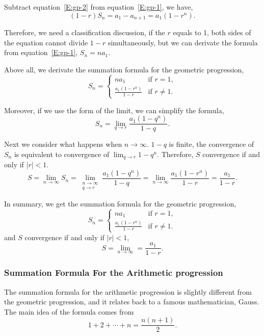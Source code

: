 Subtract equation~\eqref{E:gp-2} from equation~\eqref{E:gp-1}, we have,
\begin{equation}\label{E:gp-3}
    (1-r) S_n = a_1 - a_{n+1} = a_1(1-r^n).
\end{equation}

Therefore, we need a classification discussion, if the $r$ equals to 1, both sides of the equation cannot divide $1-r$ simultaneously, but we can derivate the formula from equation~\eqref{E:gp-1}, $S_n=na_1$.

Above all, we derivate the summation formula for the geometric progression,
\begin{equation}\label{E:gp-4}
    S_n = \begin{cases}
              na_1 & \text{if } r=1, \\
              \frac{a_1(1-r^n)}{1-r} & \text{if } r\neq 1.
          \end{cases}
\end{equation}

Moreover, if we use the form of the limit, we can simplify the formula,
\begin{equation}\label{E:gp-5}
    S_n = \lim_{q\to r} \frac{a_1(1-q^n)}{1-q}.
\end{equation}

Next we consider what happens when $n\to\infty$. $1-q$ is finite, the convergence of $S_n$ is equivalent to convergence of $\lim_{q\to r}1-q^n$. Therefore,  $S$ convergence if and only if $|r|<1$.
\begin{equation}\label{E:gp-6}
    S = \lim_{n\to\infty} S_n = \lim_{\substack{n\to\infty \\ q\to r}} \frac{a_1(1-q^n)}{1-q} = \lim_{n\to\infty}\frac{a_1(1-r^n)}{1-r} = \frac{a_1}{1-r}.
\end{equation}

In summary, we get the summation formula for the geometric progression,
\[
    S_n = \begin{cases}
              na_1 & \text{if } r=1, \\
              \frac{a_1(1-r^n)}{1-r} & \text{if } r\neq 1.
          \end{cases}
\]
and $S$ convergence if and only if $|r|<1$,
\[
    S = \lim_{n\to\infty} = \frac{a_1}{1-r}.
\]


\subsubsection{Summation Formula For the Arithmetic progression}
The summation formula for the arithmetic progression is slightly different from the geometric progression, and it relates back to a famous mathematician, Gauss. The main idea of the formula comes from
\[
    1+2+\cdots+n = \frac{n(n+1)}{2}.
\]

